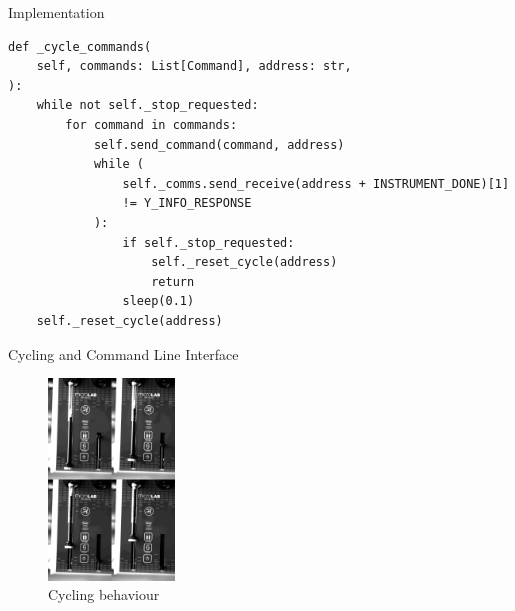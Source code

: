 \documentclass[a0paper,landscape,fontscale=0.32]{baposter}
\begin{document}
\begin{poster}
\begin{posterbox}[name=implementation,column=1,span=2]{Implementation}
\begin{verbatim}
def _cycle_commands(
    self, commands: List[Command], address: str,
):
    while not self._stop_requested:
        for command in commands:
            self.send_command(command, address)
            while (
                self._comms.send_receive(address + INSTRUMENT_DONE)[1]
                != Y_INFO_RESPONSE
            ):
                if self._stop_requested:
                    self._reset_cycle(address)
                    return
                sleep(0.1)
    self._reset_cycle(address)
\end{verbatim}
\end{posterbox}
\begin{posterbox}[name=cycling,column=1,span=2,below=implementation]{Cycling and Command Line Interface}
\begin{multicols}{2}
\begin{figure}[H]
    \begin{center}
    \includegraphics[width=0.3\textwidth]{images/combined}
    \end{center}
    \vspace{-1.2em}
  \caption{Cycling behaviour}
\end{figure}
\end{multicols}
\end{posterbox}


\end{poster}
\end{document}
